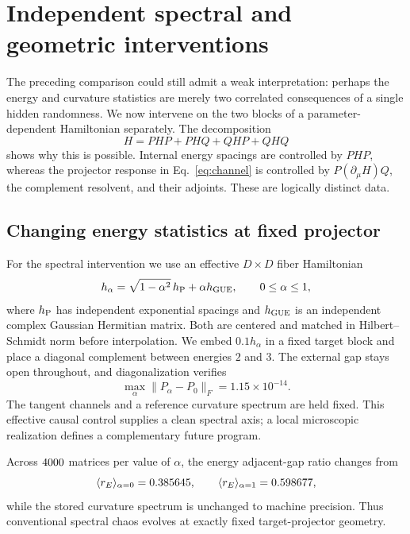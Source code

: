 \section{Independent spectral and geometric interventions}
\label{sec:covariance}

The preceding comparison could still admit a weak interpretation: perhaps the
energy and curvature statistics are merely two correlated consequences of a
single hidden randomness.
We now intervene on the two blocks of a parameter-dependent Hamiltonian
separately.
The decomposition
\begin{equation}
 H=PHP+PHQ+QHP+QHQ
 \label{eq:block-decomposition}
\end{equation}
shows why this is possible.
Internal energy spacings are controlled by \(PHP\), whereas the projector
response in Eq.~\eqref{eq:channel} is controlled by
\(P(\partial_\mu H)Q\), the complement resolvent, and their adjoints.
These are logically distinct data.

\subsection{Changing energy statistics at fixed projector}

For the spectral intervention we use an effective \(D\times D\) fiber
Hamiltonian
\begin{equation}
 h_\alpha=\sqrt{1-\alpha^2}\,h_{\rm P}+\alpha h_{\rm GUE},
 \qquad 0\leq\alpha\leq1 ,
 \label{eq:spectral-interpolation}
\end{equation}
where \(h_{\rm P}\) has independent exponential spacings and
\(h_{\rm GUE}\) is an independent complex Gaussian Hermitian matrix.
Both are centered and matched in Hilbert--Schmidt norm before interpolation.
We embed \(0.1h_\alpha\) in a fixed target block and place a diagonal
complement between energies \(2\) and \(3\).
The external gap stays open throughout, and diagonalization verifies
\begin{equation}
 \max_\alpha\|P_\alpha-P_0\|_F=1.15\times10^{-14}.
 \label{eq:projector-invariance}
\end{equation}
The tangent channels and a reference curvature spectrum are held fixed.
This effective causal control supplies a clean spectral axis; a local
microscopic realization defines a complementary future program.

Across \(4000\) matrices per value of \(\alpha\), the
energy adjacent-gap ratio changes from
\begin{equation}
 \langle r_E\rangle_{\alpha=0}=0.385645,\qquad
 \langle r_E\rangle_{\alpha=1}=0.598677 ,
 \label{eq:energy-axis}
\end{equation}
while the stored curvature spectrum is unchanged to machine precision.
Thus conventional spectral chaos evolves at exactly fixed target-projector
geometry.

